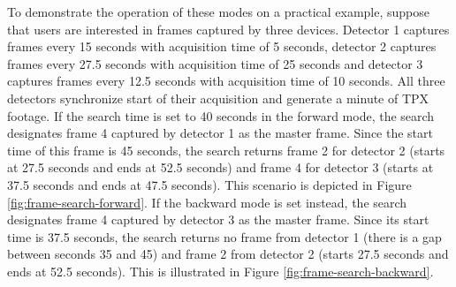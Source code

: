 To demonstrate the operation of these modes on a practical example, suppose that users are interested in frames captured by three devices. Detector 1 captures frames every 15 seconds with acquisition time of 5 seconds, detector 2 captures frames every 27.5 seconds with acquisition time of 25 seconds and detector 3 captures frames every 12.5 seconds with acquisition time of 10 seconds. All three detectors synchronize start of their acquisition and generate a minute of TPX footage. If the search time is set to 40 seconds in the forward mode, the search designates frame 4 captured by detector 1 as the master frame. Since the start time of this frame is 45 seconds, the search returns frame 2 for detector 2 (starts at 27.5 seconds and ends at 52.5 seconds) and frame 4 for detector 3 (starts at 37.5 seconds and ends at 47.5 seconds). This scenario is depicted in Figure \ref{fig:frame-search-forward}. If the backward mode is set instead, the search designates frame 4 captured by detector 3 as the master frame. Since its start time is 37.5 seconds, the search returns no frame from detector 1 (there is a gap between seconds 35 and 45) and frame 2 from detector 2 (starts 27.5 seconds and ends at 52.5 seconds). This is illustrated in Figure \ref{fig:frame-search-backward}.


